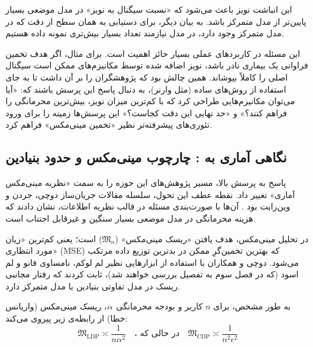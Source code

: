 این انباشت نویز باعث می‌شود که «نسبت سیگنال به نویز» در مدل موضعی بسیار پایین‌تر از مدل متمرکز باشد. به بیان دیگر، برای دستیابی به همان سطح از دقت که در مدل متمرکز وجود دارد، در مدل  نیازمند تعداد بسیار بیش‌تری نمونه داده هستیم.

این مسئله در کاربردهای عملی بسیار حائز اهمیت است. برای مثال، اگر هدف تخمین فراوانی یک بیماری نادر باشد، نویز اضافه شده توسط مکانیزم‌های  ممکن است سیگنال اصلی را کاملاً بپوشاند. همین چالش بود که پژوهشگران را بر آن داشت تا به جای استفاده از روش‌های ساده (مثل وارنر)، به دنبال پاسخ این پرسش باشند که: «آیا می‌توان مکانیزم‌هایی طراحی کرد که با کم‌ترین میزان نویز، بیش‌ترین محرمانگی را فراهم کنند؟» و «حد نهایی این دقت کجاست؟»
این پرسش‌ها زمینه را برای ورود تئوری‌های پیشرفته‌تر نظیر «تخمین مینی‌مکس» فراهم کرد.





\subsection{نگاهی آماری به : چارچوب مینی‌مکس و حدود بنیادین}
\label{sec:lit:modern-minimax}

پاسخ به پرسش بالا، مسیر پژوهش‌های این حوزه را به سمت «نظریه مینی‌مکس آماری» تغییر داد. نقطه عطف این تحول، سلسله مقالات جریان‌ساز دوچی، جردن و وین‌رایت بود \cite{Duchi2013, duchi2018}. آن‌ها با صورت‌بندی مسئله در قالب نظریه اطلاعات، نشان دادند که هزینه محرمانگی در مدل موضعی بسیار سنگین و غیرقابل اجتناب است.

در تحلیل مینی‌مکس، هدف یافتن «ریسک مینی‌مکس» ($\mathfrak{M}_n$) است؛ یعنی کم‌ترین «زیان مورد انتظاری» (MSE) که بهترین تخمین‌گرِ ممکن در بدترین توزیع داده مرتکب می‌شود. دوچی و همکاران با استفاده از ابزارهایی نظیر  لم لوکم، نامساوی فانو و لم اسود (که در فصل سوم به تفصیل بررسی خواهند شد)، ثابت کردند که رفتار مجانبی ریسک در مدل  تفاوتی بنیادین با مدل متمرکز دارد.

به طور مشخص، برای $n$ کاربر و بودجه محرمانگی $\alpha$، ریسک مینی‌مکس (واریانس خطا) از رابطه‌ی زیر پیروی می‌کند:
\begin{equation}
\label{eq:minimax-comparison-intro}
\mathfrak{M}_{\mathrm{LDP}} \asymp \frac{1}{n \alpha^2} \quad 
\text{، در حالی که} \quad 
\mathfrak{M}_{\mathrm{CDP}} \asymp \frac{1}{n^2 \epsilon^2}
\end{equation}

